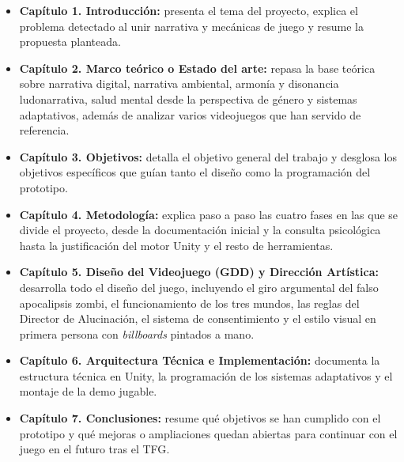 \begin{itemize}
    \item \textbf{Capítulo 1. Introducción:} presenta el tema del proyecto, explica el problema detectado al unir narrativa y mecánicas de juego y resume la propuesta planteada.
    \item \textbf{Capítulo 2. Marco teórico o Estado del arte:} repasa la base teórica sobre narrativa digital, narrativa ambiental, armonía y disonancia ludonarrativa, salud mental desde la perspectiva de género y sistemas adaptativos, además de analizar varios videojuegos que han servido de referencia.
    \item \textbf{Capítulo 3. Objetivos:} detalla el objetivo general del trabajo y desglosa los objetivos específicos que guían tanto el diseño como la programación del prototipo.
    \item \textbf{Capítulo 4. Metodología:} explica paso a paso las cuatro fases en las que se divide el proyecto, desde la documentación inicial y la consulta psicológica hasta la justificación del motor Unity y el resto de herramientas.
    \item \textbf{Capítulo 5. Diseño del Videojuego (GDD) y Dirección Artística:} desarrolla todo el diseño del juego, incluyendo el giro argumental del falso apocalipsis zombi, el funcionamiento de los tres mundos, las reglas del Director de Alucinación, el sistema de consentimiento y el estilo visual en primera persona con \textit{billboards} pintados a mano.
    \item \textbf{Capítulo 6. Arquitectura Técnica e Implementación:} documenta la estructura técnica en Unity, la programación de los sistemas adaptativos y el montaje de la demo jugable.
    \item \textbf{Capítulo 7. Conclusiones:} resume qué objetivos se han cumplido con el prototipo y qué mejoras o ampliaciones quedan abiertas para continuar con el juego en el futuro tras el \ac{TFG}.
\end{itemize}
